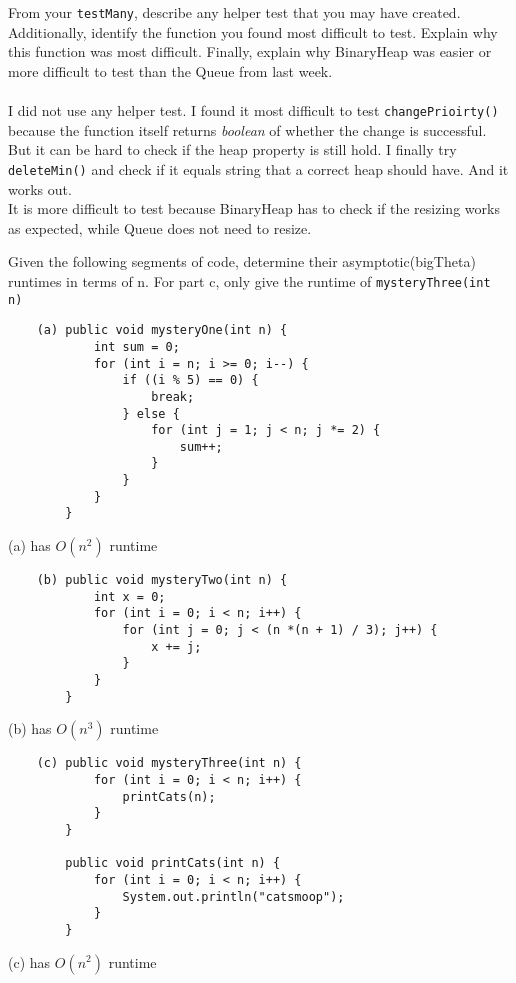 \documentclass[]{exam}
\begin{document}
\begin{questions}
	\question From your \verb|testMany|, describe any helper test that you may have created. Additionally, identify the function you found most difficult to test. Explain why this function was most difficult. Finally, explain why BinaryHeap was easier or more difficult to test than the Queue from last week.
	\\
	\\ I did not use any helper test. I found it most difficult to test \verb|changePrioirty()| because the function itself returns \textit{boolean} of whether the change is successful. But it can be hard to check if the heap property is still hold. I finally try \verb|deleteMin()| and check if it equals string that a correct heap should have. And it works out.
	\\ It is more difficult to test because BinaryHeap has to check if the resizing works as expected, while Queue does not need to resize. 

	\question Given the following segments of code, determine their asymptotic(bigTheta) runtimes in terms of n. For part c, only give the runtime of \verb|mysteryThree(int n)|
	\begin{Verbatim}
	(a) public void mysteryOne(int n) {
			int sum = 0;
			for (int i = n; i >= 0; i--) {
				if ((i % 5) == 0) {
					break;
				} else {
					for (int j = 1; j < n; j *= 2) {
						sum++;
					}
				}
			}
		}
	\end{Verbatim}
	(a) has $O(n ^ 2)$ runtime
	\begin{Verbatim}
	(b)	public void mysteryTwo(int n) { 
			int x = 0;
			for (int i = 0; i < n; i++) {
				for (int j = 0; j < (n *(n + 1) / 3); j++) {
					x += j;
				}
			}
		}
	\end{Verbatim}
	(b) has $O(n ^ 3)$ runtime
	\begin{Verbatim}
	(c) public void mysteryThree(int n) {
			for (int i = 0; i < n; i++) {
				printCats(n);
			}
		}

		public void printCats(int n) {
			for (int i = 0; i < n; i++) {
				System.out.println("catsmoop");
			}
		}
	\end{Verbatim}
	(c) has $O(n ^ 2)$ runtime
\end{questions}
\end{document}
